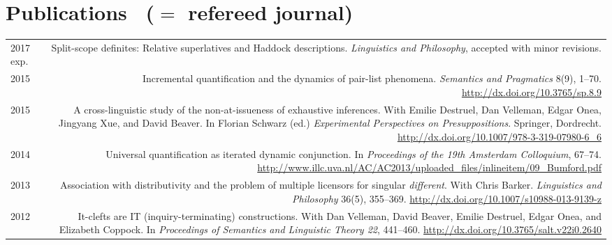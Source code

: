 \documentclass[12pt]{article}
\newcommand{\doi}[1]{\url{http://dx.doi.org/#1}}
\begin{document}
\bigskip

\section*{Publications \ \textrm{(\textdagger ${}={}$ refereed journal)}} 

\begin{longtable}{LR}
  2017 exp. & Split-scope definites: Relative superlatives and Haddock
              descriptions. \textit{Linguistics and Philosophy}, accepted with
              minor revisions.\\
  2015  & Incremental quantification and the dynamics of pair-list phenomena.
          \textit{Semantics and Pragmatics} 8(9), 1--70.
          \doi{10.3765/sp.8.9}\\
  2015  & A cross-linguistic study of the non-at-issueness of exhaustive
          inferences. With Emilie Destruel, Dan Velleman, Edgar Onea, Jingyang
          Xue, and David Beaver.  In Florian Schwarz (ed.)
          \textit{Experimental Perspectives on Presuppositions}. Springer,
          Dordrecht. \doi{10.1007/978-3-319-07980-6_6}\\ %
  2014  & Universal quantification as iterated dynamic conjunction. In
          \textit{Proceedings of the 19th Amsterdam Colloquium}, 67--74.
          \url{http://www.illc.uva.nl/AC/AC2013/uploaded_files/inlineitem/09_Bumford.pdf}\\
  2013  & Association with distributivity and the problem of multiple
          licensors for singular \textit{different}. With Chris Barker.
          \textit{Linguistics and Philosophy} 36(5), 355--369.
          \doi{10.1007/s10988-013-9139-z}\\ %
  2012  & It-clefts are IT (inquiry-terminating) constructions. With Dan
          Velleman, David Beaver, Emilie Destruel, Edgar Onea, and Elizabeth
          Coppock. In \textit{Proceedings of Semantics and Linguistic Theory
          22}, 441--460. \doi{10.3765/salt.v22i0.2640}
\end{longtable}

\bigskip
\end{document}
